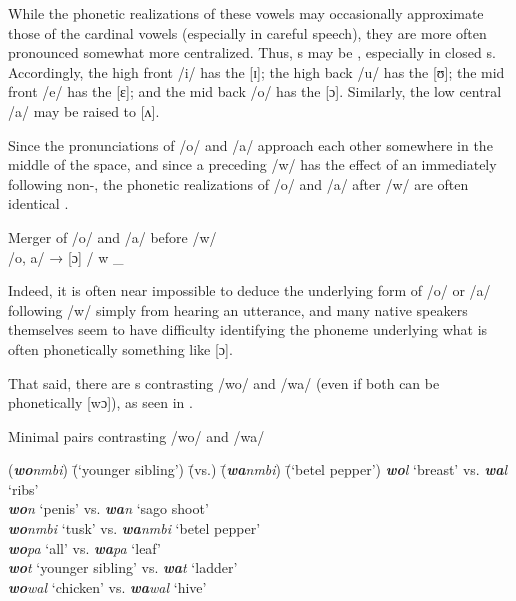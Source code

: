 While the phonetic realizations of these vowels may occasionally approximate those of the cardinal vowels (especially in careful speech), they are more often pronounced somewhat more centralized. Thus, s may be , especially in closed s. Accordingly, the high front   /i/ has the  [ɪ]; the high back   /u/ has the  [ʊ]; the mid front   /e/ has the  [ɛ]; and the mid back   /o/ has the  [ɔ]. Similarly, the  low central   /a/ may be raised to [ʌ].

Since the  pronunciations of /o/ and /a/ approach each other somewhere in the middle of the  space, and since a preceding  /w/ has the effect of  an immediately following non-, the phonetic realizations of /o/ and /a/ after /w/ are often identical .

\ea%
    \label{ex:phon:44}
          Merger of /o/ and /a/ before /w/\\
    /o, a/ → [ɔ] / w \_
\z

Indeed, it is often near impossible to deduce the underlying form of /o/ or /a/ following /w/ simply from hearing an utterance, and many native speakers themselves seem to have difficulty identifying the phoneme underlying what is often phonetically something like [ɔ].

  That said, there are s contrasting /wo/ and /wa/ (even if both can be phonetically [wɔ]), as seen in .

\ea%
    \label{ex:phon:45}
          Minimal pairs contrasting /wo/ and /wa/\\
\begin{tabbing}
{(\textit{\textbf{wo}nmbi})} \= {(‘younger sibling’)} \= {(vs.)} \= {(\textit{\textbf{wa}nmbi})} \= {(‘betel pepper’)}\kill
{\textit{\textbf{wo}l}} \> {‘breast’} \> {vs.} \> {\textit{\textbf{wa}l}} \> {‘ribs’}\\
{\textit{\textbf{wo}n}} \> {‘penis’} \> {vs.} \> {\textit{\textbf{wa}n}} \> {‘sago shoot’}\\
{\textit{\textbf{wo}nmbi}} \> {‘tusk’} \> {vs.} \> {\textit{\textbf{wa}nmbi}} \> {‘betel pepper’}\\
{\textit{\textbf{wo}pa}} \> {‘all’} \> {vs.} \> {\textit{\textbf{wa}pa}} \> {‘leaf’}\\
{\textit{\textbf{wo}t}} \> {‘younger sibling’} \> {vs.} \> {\textit{\textbf{wa}t}} \> {‘ladder’}\\
{\textit{\textbf{wo}wal}} \> {‘chicken’} \> {vs.} \> {\textit{\textbf{wa}wal}} \> {‘hive’}
\end{tabbing}
\z


